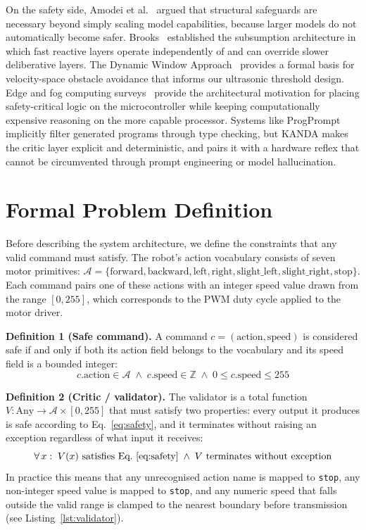 \documentclass[conference]{IEEEtran}
\newcommand{\safe}{\texttt{stop}}
\begin{document}
On the safety side, Amodei et al.~\cite{amodei2016safety} argued that structural safeguards are necessary beyond simply scaling model capabilities, because larger models do not automatically become safer. Brooks~\cite{brooks1986robust} established the subsumption architecture in which fast reactive layers operate independently of and can override slower deliberative layers. The Dynamic Window Approach~\cite{fox1997dwa} provides a formal basis for velocity-space obstacle avoidance that informs our ultrasonic threshold design. Edge and fog computing surveys~\cite{bonomi2012fog,shi2016edge} provide the architectural motivation for placing safety-critical logic on the microcontroller while keeping computationally expensive reasoning on the more capable processor. Systems like ProgPrompt implicitly filter generated programs through type checking, but KANDA makes the critic layer explicit and deterministic, and pairs it with a hardware reflex that cannot be circumvented through prompt engineering or model hallucination.

\section{Formal Problem Definition}
\label{sec:formal}

Before describing the system architecture, we define the constraints that any valid command must satisfy. The robot's action vocabulary consists of seven motor primitives: $\mathcal{A} = \{\text{forward}, \text{backward}, \text{left}, \text{right}, \text{slight\_left}, \text{slight\_right}, \text{stop}\}$. Each command pairs one of these actions with an integer speed value drawn from the range $[0, 255]$, which corresponds to the PWM duty cycle applied to the motor driver.

\textbf{Definition 1 (Safe command).}
A command $c = (\text{action}, \text{speed})$ is considered safe if and only if both its action field belongs to the vocabulary and its speed field is a bounded integer:
\begin{equation}
\label{eq:safety}
c.\text{action} \in \mathcal{A} \;\wedge\; c.\text{speed} \in \mathbb{Z} \;\wedge\; 0 \leq c.\text{speed} \leq 255
\end{equation}

\textbf{Definition 2 (Critic / validator).}
The validator is a total function $V : \text{Any} \to \mathcal{A} \times [0,255]$ that must satisfy two properties: every output it produces is safe according to Eq.~\eqref{eq:safety}, and it terminates without raising an exception regardless of what input it receives:
\begin{equation}
\label{eq:validator}
\forall\, x :\; V(x) \text{ satisfies Eq.~\eqref{eq:safety}} \;\wedge\; V \text{ terminates without exception}
\end{equation}
In practice this means that any unrecognised action name is mapped to \safe{}, any non-integer speed value is mapped to \safe{}, and any numeric speed that falls outside the valid range is clamped to the nearest boundary before transmission (see Listing~\ref{lst:validator}).
\end{document}
